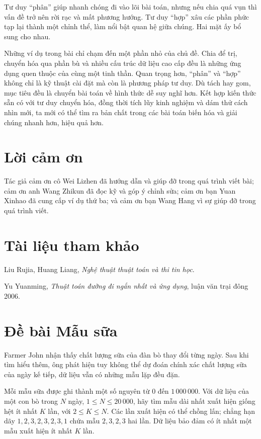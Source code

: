 \documentclass[11pt]{article}
\begin{document}
Tư duy ``phân'' giúp nhanh chóng đi vào lõi bài toán, nhưng nếu chia quá vụn
thì vấn đề trở nên rời rạc và mất phương hướng. Tư duy ``hợp'' xâu các phần
phức tạp lại thành một chỉnh thể, làm nổi bật quan hệ giữa chúng. Hai mặt ấy
bổ sung cho nhau.

Những ví dụ trong bài chỉ chạm đến một phần nhỏ của chủ đề. Chia để trị,
chuyển hóa qua phần bù và nhiều cấu trúc dữ liệu cao cấp đều là những ứng
dụng quen thuộc của cùng một tinh thần. Quan trọng hơn, ``phân'' và ``hợp''
không chỉ là kỹ thuật cài đặt mà còn là phương pháp tư duy. Dù tách hay gom,
mục tiêu đều là chuyển bài toán về hình thức dễ suy nghĩ hơn. Kết hợp kiến
thức sẵn có với tư duy chuyển hóa, đồng thời tích lũy kinh nghiệm và dám thử
cách nhìn mới, ta mới có thể tìm ra bản chất trong các bài toán biến hóa và
giải chúng nhanh hơn, hiệu quả hơn.

\section*{Lời cảm ơn}

Tác giả cảm ơn cô Wei Lizhen đã hướng dẫn và giúp đỡ trong quá trình viết bài;
cảm ơn anh Wang Zhikun đã đọc kỹ và góp ý chỉnh sửa; cảm ơn bạn Yuan Xinhao
đã cung cấp ví dụ thứ ba; và cảm ơn bạn Wang Hang vì sự giúp đỡ trong quá
trình viết.

\section*{Tài liệu tham khảo}

\begin{enumerate}[label={[\Alph*]}]
  \item Liu Rujia, Huang Liang, \textit{Nghệ thuật thuật toán và thi tin học}.
  \item Yu Yuanming, \textit{Thuật toán đường đi ngắn nhất và ứng dụng}, luận
        văn trại đông 2006.
\end{enumerate}

\appendix
\section{Đề bài Mẫu sữa}

Farmer John nhận thấy chất lượng sữa của đàn bò thay đổi từng ngày. Sau khi
tìm hiểu thêm, ông phát hiện tuy không thể dự đoán chính xác chất lượng sữa
của ngày kế tiếp, dữ liệu vẫn có những mẫu lặp đều đặn.

Mỗi mẫu sữa được ghi thành một số nguyên từ \(0\) đến \(1\,000\,000\). Với dữ
liệu của một con bò trong \(N\) ngày, \(1\le N\le 20\,000\), hãy tìm mẫu dài
nhất xuất hiện giống hệt ít nhất \(K\) lần, với \(2\le K\le N\). Các lần xuất
hiện có thể chồng lấn; chẳng hạn dãy \(1,2,3,2,3,2,3,1\) chứa mẫu
\(2,3,2,3\) hai lần. Dữ liệu bảo đảm có ít nhất một mẫu xuất hiện ít nhất
\(K\) lần.
\end{document}

